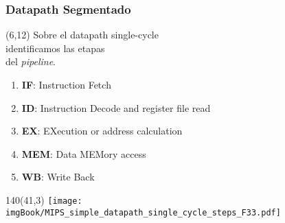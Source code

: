 \documentclass[aspectratio=169]{beamer}
\begin{document}
\begin{frame}[t,fragile]
    \frametitle{Datapath Segmentado}
    \begin{textblock}{70}(6,12)
    \small
    Sobre el datapath single-cycle\\
    identificamos las etapas\\
    del \emph{pipeline}.\\
    \vspace{0.2cm}
    \vspace{0.2cm}
    \begin{enumerate}
    \item<3-> \textcolor{naranjauca}{\textbf{IF}}: Instruction Fetch
    \item<3-> \textcolor{naranjauca}{\textbf{ID}}: Instruction Decode and register file read
    \item<3-> \textcolor{naranjauca}{\textbf{EX}}: EXecution or address calculation
    \item<3-> \textcolor{naranjauca}{\textbf{MEM}}: Data MEMory access
    \item<3-> \textcolor{naranjauca}{\textbf{WB}}: Write Back
    \end{enumerate}
    \end{textblock}
    \begin{textblock}{140}(41,3)
    \texttt{[image: imgBook/MIPS\_simple\_datapath\_single\_cycle\_steps\_F33.pdf]}
    \end{textblock}
\end{frame}
\end{document}
